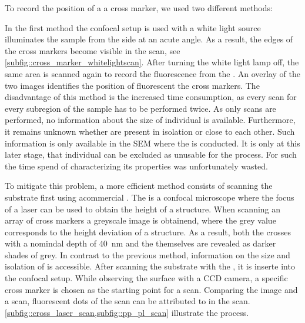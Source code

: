 		To record the position of a \nd \wrt a cross marker, we used two different methods:

		In the first method the confocal setup is used with a white light source illuminates the sample from the side at an acute angle. As a result, the edges of the cross markers become visible in the \fl scan, see \autoref{subfig::cross_marker_whitelightscan}. After turning the white light lamp off, the same area is scanned again to record the fluorescence from the \sivs. An overlay of the two images identifies the position of fluorescent \sivs \wrt the cross markers. The disadvantage of this method is the increased time consumption, as every scan for every subregion of the sample has to be performed twice. As only \fl scans are performed, no information about the size of individual \nds is available. Furthermore, it remains unknown whether \nds are present in isolation or close to each other. Such information is only available in the SEM where the \pp is conducted. It is only at this later stage, that individual \nds can be excluded as unusable for the \pp process. For such \nds the time spend of characterizing its properties was unfortunately wasted.

		To mitigate this problem, a more efficient method consists of scanning the substrate first using acommercial \lsm. The \lsm is a confocal microscope where the focus of a laser can be used to obtain the height of a structure. When scanning an array of cross markers a greyscale image is obtainend, where the grey value corresponds to the height deviation of a structure. As a result, both the crosses with a nomindal depth of \SI{40}{\nm} and the \nds themselves are revealed as darker shades of grey. In contrast to the previous method, information on the size and isolation of \nds is accessible. After scanning the substrate with the \lsm, it is inserte into the confocal setup. While observing the surface with a CCD camera, a specific cross marker is chosen as the starting point for a \fl scan. Comparing the \lsm image and a \fl scan, fluorescent dots of the \fl scan can be attributed to \nds in the \lsm scan. \autoref{subfig::cross_laser_scan,subfig::pp_pl_scan} illustrate the process.


